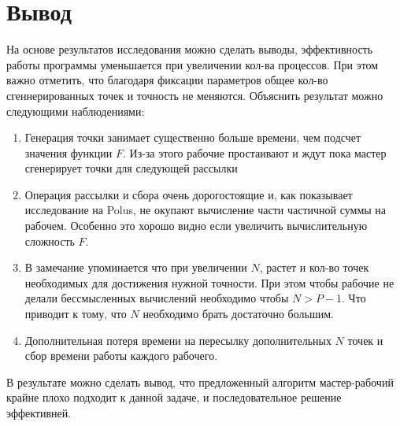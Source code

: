 \documentclass[12pt, a4paper ]{article}
\begin{document}
  \section{\large Вывод}
  На основе результатов исследования можно сделать выводы, эффективность работы программы уменьшается при увеличении кол-ва процессов. При этом важно отметить, что благодаря фиксации параметров общее кол-во сгеннерированных точек и точность не меняются. Объяснить результат можно следующими наблюдениями:
 \begin{enumerate}
 \item Генерация точки занимает существенно больше времени, чем подсчет значения  функции $F$. Из-за этого рабочие простаивают и ждут пока мастер сгенерирует точки для следующей рассылки
 \item Операция рассылки и сбора очень дорогостоящие и, как показывает исследование на Polus, не окупают вычисление части частичной суммы на рабочем. Особенно это хорошо видно если увеличить вычислительную сложность $F$.
 \item В замечание упоминается что при увеличении $N$, растет и кол-во точек необходимых для достижения нужной точности. При этом чтобы рабочие не делали бессмысленных вычислений необходимо чтобы $N > P - 1$. Что приводит к тому, что $N$ необходимо брать достаточно большим. 
 \item Дополнительная потеря времени на пересылку дополнительных $N$ точек и сбор времени работы каждого рабочего.
\end{enumerate}  
В результате можно сделать вывод, что предложенный алгоритм мастер-рабочий крайне плохо подходит к данной задаче, и последовательное решение эффективней.
\end{document}
